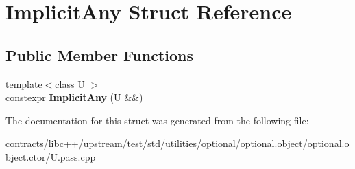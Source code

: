 \hypertarget{struct_implicit_any}{}\section{Implicit\+Any Struct Reference}
\label{struct_implicit_any}
\subsection*{Public Member Functions}
\begin{DoxyCompactItemize}
\item 
\mbox{\label{struct_implicit_any_a0a545a3ec6f6ea1227ace19fedb1e5fa}} 
{\footnotesize template$<$class U $>$ }\\constexpr {\bfseries Implicit\+Any} (\mbox{\hyperlink{union_u}{U}} \&\&)
\end{DoxyCompactItemize}


The documentation for this struct was generated from the following file\+:\begin{DoxyCompactItemize}
\item 
contracts/libc++/upstream/test/std/utilities/optional/optional.\+object/optional.\+object.\+ctor/U.\+pass.\+cpp\end{DoxyCompactItemize}
